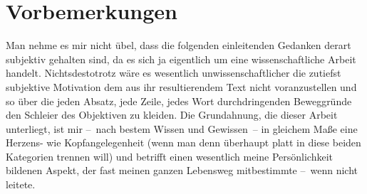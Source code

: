 \chapter*{Vorbemerkungen}\label{ch:introduction}

Man nehme es mir nicht übel, dass die folgenden einleitenden Gedanken derart
  subjektiv gehalten sind, da es sich ja eigentlich um eine wissenschaftliche Arbeit
  handelt.
Nichtsdestotrotz wäre es wesentlich unwissenschaftlicher die zutiefst
  subjektive Motivation dem aus ihr resultierendem Text nicht voranzustellen
  und so über die jeden Absatz, jede Zeile, jedes Wort durchdringenden
  Beweggründe den Schleier des Objektiven zu kleiden.
Die Grundahnung, die dieser Arbeit unterliegt, ist mir --~nach bestem Wissen
  und Gewissen~-- in gleichem Maße eine Herzens- wie Kopfangelegenheit (wenn
  man denn überhaupt platt in diese beiden Kategorien trennen will)
  und betrifft einen wesentlich meine Persönlichkeit bildenen 
  Aspekt, der fast meinen ganzen Lebensweg mitbestimmte --~wenn nicht leitete.

